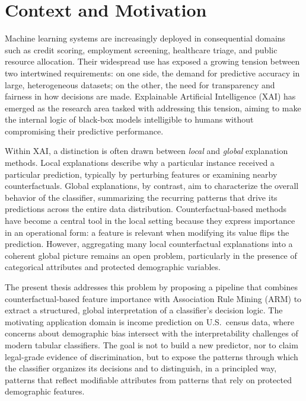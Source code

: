 
\section{Context and Motivation}
\label{sec:intro-context}

Machine learning systems are increasingly deployed in consequential domains such as credit scoring, employment screening, healthcare triage, and public resource allocation. Their widespread use has exposed a growing tension between two intertwined requirements: on one side, the demand for predictive accuracy in large, heterogeneous datasets; on the other, the need for transparency and fairness in how decisions are made. Explainable Artificial Intelligence (XAI) has emerged as the research area tasked with addressing this tension, aiming to make the internal logic of black-box models intelligible to humans without compromising their predictive performance.

Within XAI, a distinction is often drawn between \emph{local} and \emph{global} explanation methods. Local explanations describe why a particular instance received a particular prediction, typically by perturbing features or examining nearby counterfactuals. Global explanations, by contrast, aim to characterize the overall behavior of the classifier, summarizing the recurring patterns that drive its predictions across the entire data distribution. Counterfactual-based methods have become a central tool in the local setting because they express importance in an operational form: a feature is relevant when modifying its value flips the prediction. However, aggregating many local counterfactual explanations into a coherent global picture remains an open problem, particularly in the presence of categorical attributes and protected demographic variables.

The present thesis addresses this problem by proposing a pipeline that combines counterfactual-based feature importance with Association Rule Mining (ARM) to extract a structured, global interpretation of a classifier's decision logic. The motivating application domain is income prediction on U.S.\ census data, where concerns about demographic bias intersect with the interpretability challenges of modern tabular classifiers. The goal is not to build a new predictor, nor to claim legal-grade evidence of discrimination, but to expose the patterns through which the classifier organizes its decisions and to distinguish, in a principled way, patterns that reflect modifiable attributes from patterns that rely on protected demographic features.

